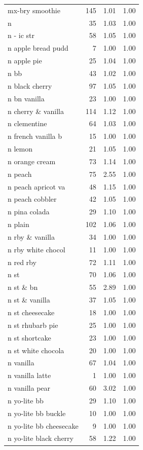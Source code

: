 \begin{table}
\begin{tabular}{lrrr}
mx-bry smoothie & 145 & 1.01 & 1.00 \\
n & 35 & 1.03 & 1.00 \\
n - ic str & 58 & 1.05 & 1.00 \\
n apple bread pudd & 7 & 1.00 & 1.00 \\
n apple pie & 25 & 1.04 & 1.00 \\
n bb & 43 & 1.02 & 1.00 \\
n black cherry & 97 & 1.05 & 1.00 \\
n bn vanilla & 23 & 1.00 & 1.00 \\
n cherry \& vanilla & 114 & 1.12 & 1.00 \\
n clementine & 64 & 1.03 & 1.00 \\
n french vanilla b & 15 & 1.00 & 1.00 \\
n lemon & 21 & 1.05 & 1.00 \\
n orange cream & 73 & 1.14 & 1.00 \\
n peach & 75 & 2.55 & 1.00 \\
n peach apricot va & 48 & 1.15 & 1.00 \\
n peach cobbler & 42 & 1.05 & 1.00 \\
n pina colada & 29 & 1.10 & 1.00 \\
n plain & 102 & 1.06 & 1.00 \\
n rby \& vanilla & 34 & 1.00 & 1.00 \\
n rby white chocol & 11 & 1.00 & 1.00 \\
n red rby & 72 & 1.11 & 1.00 \\
n st & 70 & 1.06 & 1.00 \\
n st \& bn & 55 & 2.89 & 1.00 \\
n st \& vanilla & 37 & 1.05 & 1.00 \\
n st cheesecake & 18 & 1.00 & 1.00 \\
n st rhubarb pie & 25 & 1.00 & 1.00 \\
n st shortcake & 23 & 1.00 & 1.00 \\
n st white chocola & 20 & 1.00 & 1.00 \\
n vanilla & 67 & 1.04 & 1.00 \\
n vanilla latte & 1 & 1.00 & 1.00 \\
n vanilla pear & 60 & 3.02 & 1.00 \\
n yo-lite bb & 29 & 1.10 & 1.00 \\
n yo-lite bb buckle & 10 & 1.00 & 1.00 \\
n yo-lite bb cheesecake & 9 & 1.00 & 1.00 \\
n yo-lite black cherry & 58 & 1.22 & 1.00 \\

\end{tabular}
\end{table}
